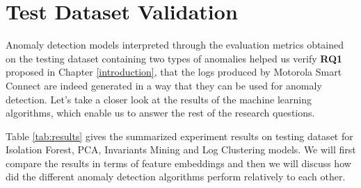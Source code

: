 \section{Test Dataset Validation}

Anomaly detection models interpreted through the evaluation metrics obtained on the testing dataset containing two types of anomalies helped us verify \textbf{RQ1} proposed in Chapter \ref{introduction}, that the logs produced by Motorola Smart Connect are indeed generated in a way that they can be used for anomaly detection. Let's take a closer look at the results of the machine learning algorithms, which enable us to answer the rest of the research questions.

Table \ref{tab:results} gives the summarized experiment results on testing dataset for Isolation Forest, PCA, Invariants Mining and Log Clustering models. We will first compare the results in terms of feature embeddings and then we will discuss how did the different anomaly detection algorithms perform relatively to each other. 

